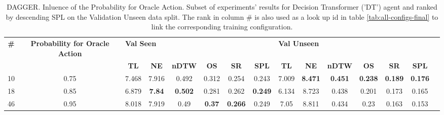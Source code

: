 \begin{table}
\centering
\caption{\label{tab:dt_dagger_prob}DAGGER. Inluence of the Probability for Oracle Action. Subset of experiments' results for Decision Transformer ('DT') agent and ranked by descending SPL on the Validation Unseen data split. The rank in column \# is also used as a look up id in table \ref{tab:all-configs-final} to link the corresponding training configuration.}
\begin{tabular}{@{\hskip3pt}c@{\hskip3pt}c@{\hskip3pt}c@{\hskip3pt}c@{\hskip3pt}c@{\hskip3pt}c@{\hskip3pt}c@{\hskip3pt}c@{\hskip3pt}c@{\hskip3pt}c@{\hskip3pt}c@{\hskip3pt}c@{\hskip3pt}c@{\hskip3pt}c@{\hskip3pt}c}
\toprule
\textbf{\#} & \textbf{Probability for Oracle Action} & \multicolumn{6}{l}{\textbf{Val Seen}} & \multicolumn{6}{l}{\textbf{Val Unseen}} \\
 \textbf{~} &                             \textbf{~} &       \textbf{TL} &    \textbf{NE} &   \textbf{nDTW} &    \textbf{OS} &     \textbf{SR} &    \textbf{SPL} &         \textbf{TL} &     \textbf{NE} &   \textbf{nDTW} &     \textbf{OS} &     \textbf{SR} &    \textbf{SPL} \\
\midrule
         10 &                                   0.75 &             7.468 &          7.916 &           0.492 &          0.312 &           0.254 &           0.243 &               7.009 &  \textbf{8.471} &  \textbf{0.451} &  \textbf{0.238} &  \textbf{0.189} &  \textbf{0.176} \\
         18 &                                   0.85 &             6.879 &  \textbf{7.84} &  \textbf{0.502} &          0.281 &           0.262 &  \textbf{0.249} &               6.134 &           8.723 &           0.438 &           0.201 &           0.173 &           0.165 \\
         46 &                                   0.95 &             8.018 &          7.919 &            0.49 &  \textbf{0.37} &  \textbf{0.266} &           0.249 &                7.05 &           8.811 &           0.434 &            0.23 &           0.163 &           0.153 \\
\bottomrule
\end{tabular}
\end{table}

